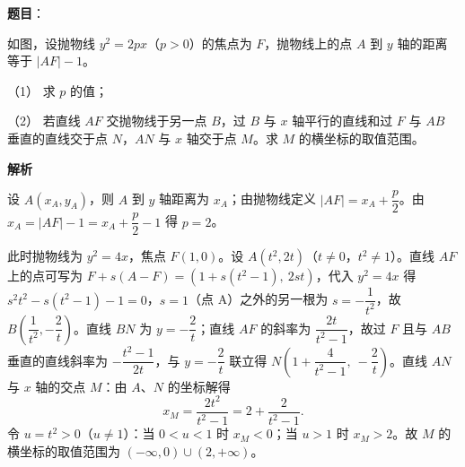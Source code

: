 \begin{answer}

\textbf{题目}：

如图，设抛物线 \(y^{2}=2px\)（\(p>0\)）的焦点为 \(F\)，抛物线上的点 \(A\) 到 \(y\) 轴的距离等于 \(|AF|-1\)。

（1） 求 \(p\) 的值；

（2） 若直线 \(AF\) 交抛物线于另一点 \(B\)，过 \(B\) 与 \(x\) 轴平行的直线和过 \(F\) 与 \(AB\) 垂直的直线交于点 \(N\)，\(AN\) 与 \(x\) 轴交于点 \(M\)。求 \(M\) 的横坐标的取值范围。
\nopagebreak[4]
\begin{center}\end{center}
\nopagebreak[4]
\textbf{解析}


设 \(A(x_{A},y_{A})\)，则 \(A\) 到 \(y\) 轴距离为 \(x_{A}\)；由抛物线定义 \(|AF|=x_{A}+\dfrac{p}{2}\)。由 \(x_{A}=|AF|-1=x_{A}+\dfrac{p}{2}-1\) 得 \(p=2\)。


此时抛物线为 \(y^{2}=4x\)，焦点 \(F(1,0)\)。设 \(A(t^{2},2t)\)（\(t\neq0\)，\(t^{2}\neq1\)）。直线 \(AF\) 上的点可写为 \(F+s(A-F)=(1+s(t^{2}-1),\ 2st)\)，代入 \(y^{2}=4x\) 得 \(s^{2}t^{2}-s(t^{2}-1)-1=0\)，\(s=1\)（点 A）之外的另一根为 \(s=-\dfrac{1}{t^{2}}\)，故 \(B\left(\dfrac{1}{t^{2}},-\dfrac{2}{t}\right)\)。直线 \(BN\) 为 \(y=-\dfrac{2}{t}\)；直线 \(AF\) 的斜率为 \(\dfrac{2t}{t^{2}-1}\)，故过 \(F\) 且与 \(AB\) 垂直的直线斜率为 \(-\dfrac{t^{2}-1}{2t}\)，与 \(y=-\dfrac{2}{t}\) 联立得 \(N\left(1+\dfrac{4}{t^{2}-1},\ -\dfrac{2}{t}\right)\)。直线 \(AN\) 与 \(x\) 轴的交点 \(M\)：由 \(A\)、\(N\) 的坐标解得
\nopagebreak[4]
\[
x_{M}=\frac{2t^{2}}{t^{2}-1}=2+\frac{2}{t^{2}-1}.
\]
令 \(u=t^{2}>0\)（\(u\neq1\)）：当 \(0<u<1\) 时 \(x_{M}<0\)；当 \(u>1\) 时 \(x_{M}>2\)。故 \(M\) 的横坐标的取值范围为 \((-\infty,0)\cup(2,+\infty)\)。



\end{answer}
